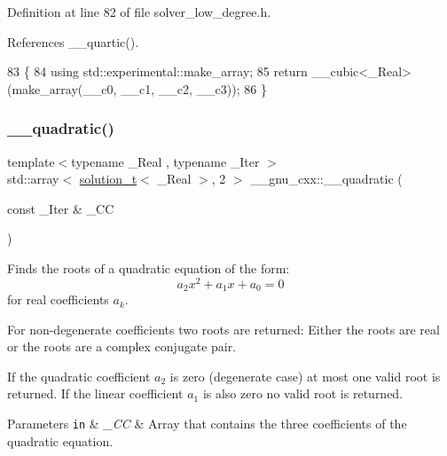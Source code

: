 Definition at line 82 of file solver\+\_\+low\+\_\+degree.\+h.



References \+\_\+\+\_\+quartic().


\begin{DoxyCode}
83     \{
84       \textcolor{keyword}{using} std::experimental::make\_array;
85       \textcolor{keywordflow}{return} \_\_cubic<\_Real>(make\_array(\_\_c0, \_\_c1, \_\_c2, \_\_c3));
86     \}
\end{DoxyCode}
\mbox{\label{namespace____gnu__cxx_aa8c3d98e6508a1e20a17c5980ccbbd99}} 
\subsubsection{\texorpdfstring{\+\_\+\+\_\+quadratic()}{\_\_quadratic()}\hspace{0.1cm}{\footnotesize\ttfamily [1/2]}}
{\footnotesize\ttfamily template$<$typename \+\_\+\+Real , typename \+\_\+\+Iter $>$ \\
std\+::array$<$ \hyperlink{namespace____gnu__cxx_ae20ea642de50eb361074c62676b0159c}{solution\+\_\+t}$<$ \+\_\+\+Real $>$, 2 $>$ \+\_\+\+\_\+gnu\+\_\+cxx\+::\+\_\+\+\_\+quadratic (\begin{DoxyParamCaption}\item[{const \+\_\+\+Iter \&}]{\+\_\+\+CC }\end{DoxyParamCaption})}



Finds the roots of a quadratic equation of the form\+: \[ a_2 x^2 + a_1 x + a_0 = 0 \] for real coefficients $ a_k $. 

For non-\/degenerate coefficients two roots are returned\+: Either the roots are real or the roots are a complex conjugate pair.

If the quadratic coefficient $ a_2 $ is zero (degenerate case) at most one valid root is returned. If the linear coefficient $ a_1 $ is also zero no valid root is returned.


\begin{DoxyParams}[1]{Parameters}
\mbox{\tt in}  & {\em \+\_\+\+CC} & Array that contains the three coefficients of the quadratic equation. \\
\hline
\end{DoxyParams}


